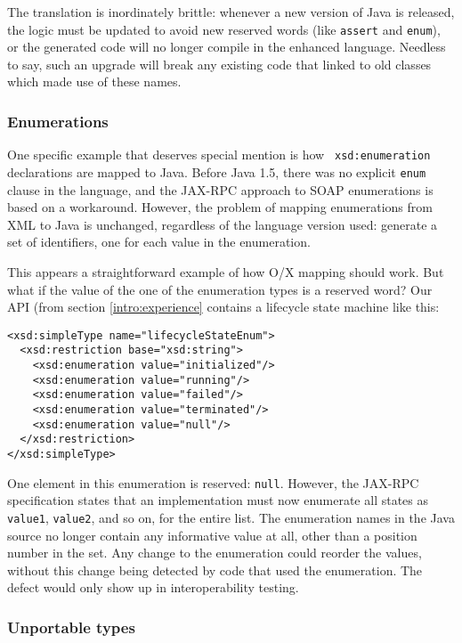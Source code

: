 The translation is inordinately brittle: whenever a new
version of Java is released, the logic must be updated to avoid new
reserved words (like {\tt assert} and {\tt enum}), or the generated
code will no longer compile in the enhanced language. Needless to say,
such an upgrade will break any existing code that linked to old
classes which made use of these names.

\subsubsection{Enumerations}
\label{objections:o-x:enum}

One specific example that deserves special mention is how {\tt
xsd:enumeration} declarations are mapped to Java. Before Java 1.5,
there was no explicit {\tt enum} clause in the language, and the
JAX-RPC approach to SOAP enumerations is based on a
workaround. However, the problem of mapping enumerations from XML to
Java is unchanged, regardless of the language version used: generate a
set of identifiers, one for each value in the enumeration.

This appears a straightforward example of how O/X mapping should
work. But what if the value of the one of the enumeration types is a
reserved word?  Our API (from section \ref{intro:experience} contains
a lifecycle state machine like this:

\begin{verbatim}
<xsd:simpleType name="lifecycleStateEnum">
  <xsd:restriction base="xsd:string"> 
    <xsd:enumeration value="initialized"/> 
    <xsd:enumeration value="running"/> 
    <xsd:enumeration value="failed"/> 
    <xsd:enumeration value="terminated"/> 
    <xsd:enumeration value="null"/> 
  </xsd:restriction>
</xsd:simpleType>
\end{verbatim}

One element in this enumeration is reserved: {\tt null}. However, the
JAX-RPC specification states that an implementation must now enumerate
all states as {\tt value1}, {\tt value2}, and so on, for the entire
list.  The enumeration names in the Java source no longer contain any
informative value at all, other than a position number in the
set. Any change to the enumeration
could reorder the values, without this change being detected by code
that used the enumeration. The defect would only show up in interoperability
testing. 

\subsubsection{Unportable types}
\label{objections:o-x:types}

